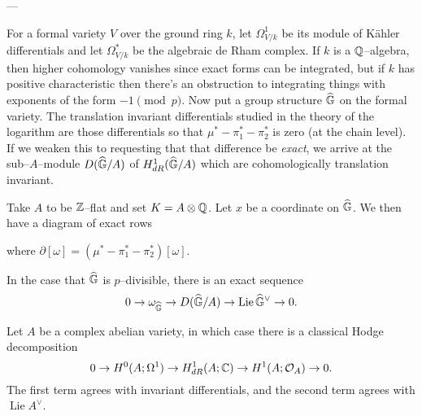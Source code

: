---


For a formal variety $V$ over the ground ring $k$, let $\Omega^1_{V/k}$ be its module of K\"ahler differentials and let $\Omega^*_{V/k}$ be the algebraic de Rham complex.  If $k$ is a $\mathbb{Q}$--algebra, then higher cohomology vanishes since exact forms can be integrated, but if $k$ has positive characteristic then there's an obstruction to integrating things with exponents of the form $-1 \pmod p$.  Now put a group structure $\widehat{\mathbb G}$ on the formal variety.  The translation invariant differentials studied in the theory of the logarithm are those differentials so that $\mu^* - \pi_1^* - \pi_2^*$ is zero (at the chain level).  If we weaken this to requesting that that difference be \emph{exact}, we arrive at the sub--$A$--module $D(\widehat{\mathbb G}/A)$ of $H^1_{dR}(\widehat{\mathbb G}/A)$ which are cohomologically translation invariant.

\begin{lemma}
Take $A$ to be $\mathbb Z$--flat and set $K = A \otimes \mathbb{Q}$.  Let $x$ be a coordinate on $\widehat{\mathbb G}$.  We then have a diagram of exact rows
\begin{center}
\end{center}
where $\partial[\omega] = (\mu^* - \pi_1^* - \pi_2^*)[\omega]$.
\end{lemma}

\begin{lemma}
In the case that $\widehat{\mathbb G}$ is $p$--divisible, there is an exact sequence \[0 \to \omega_{\widehat{\mathbb G}} \to D(\widehat{\mathbb G}/A) \to \operatorname{Lie} \widehat{\mathbb G}^\vee \to 0.\]
\end{lemma}

\begin{remark}
Let $A$ be a complex abelian variety, in which case there is a classical Hodge decomposition \[0 \to H^0(A; \Omega^1) \to H^1_{dR}(A; \mathbb{C}) \to H^1(A; \mathcal{O}_A) \to 0.\]  The first term agrees with invariant differentials, and the second term agrees with $\operatorname{Lie} A^\vee$.
\end{remark}

